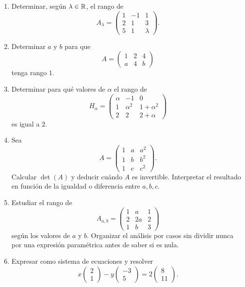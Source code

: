 \begin{enumerate}[label=\textbf{\arabic*.},leftmargin=*]
\item Determinar, según $\lambda\in\mathbb{R}$, el rango de
\[
A_\lambda=
\begin{pmatrix}
1&-1&1\\
2&1&3\\
5&1&\lambda
\end{pmatrix}.
\]

\item Determinar $a$ y $b$ para que
\[
A=\begin{pmatrix}1&2&4\\a&4&b\end{pmatrix}
\]
tenga rango $1$.

\item Determinar para qué valores de $\alpha$ el rango de
\[
H_\alpha=
\begin{pmatrix}
\alpha&-1&0\\
1&\alpha^2&1+\alpha^2\\
2&2&2+\alpha
\end{pmatrix}
\]
es igual a $2$.

\item Sea
\[
A=\begin{pmatrix}
1&a&a^2\\
1&b&b^2\\
1&c&c^2
\end{pmatrix}.
\]
Calcular $\det(A)$ y deducir cuándo $A$ es invertible. Interpretar el resultado en función de la igualdad o diferencia entre $a,b,c$.

\item Estudiar el rango de
\[
A_{a,b}=
\begin{pmatrix}
1&a&1\\
2&2a&2\\
1&b&3
\end{pmatrix}
\]
según los valores de $a$ y $b$. Organizar el análisis por casos sin dividir nunca por una expresión paramétrica antes de saber si es nula.

\item Expresar como sistema de ecuaciones y resolver
\[
x\begin{pmatrix}2\\1\end{pmatrix}
-y\begin{pmatrix}-3\\5\end{pmatrix}
=2\begin{pmatrix}8\\11\end{pmatrix}.
\]


\end{enumerate}
